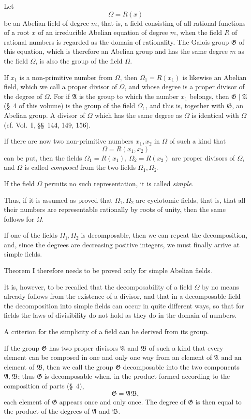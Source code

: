\documentclass[11pt]{article}
\newcommand{\Om}{\Omega}
\newcommand{\Gg}{\mathfrak G}
\newcommand{\Aa}{\mathfrak A}
\newcommand{\Bb}{\mathfrak B}
\begin{document}
Let
\[
  \Om=R(x)
\]
be an Abelian field of degree $m$, that is, a field consisting of all rational functions of a root $x$ of an irreducible Abelian equation of degree $m$, when the field $R$ of rational numbers is regarded as the domain of rationality. The Galois group $\Gg$ of this equation, which is therefore an Abelian group and has the same degree $m$ as the field $\Om$, is also the group of the field $\Om$.

If $x_1$ is a non-primitive number from $\Om$, then $\Om_1=R(x_1)$ is likewise an Abelian field, which we call a proper divisor of $\Om$, and whose degree is a proper divisor of the degree of $\Om$. For if $\Aa$ is the group to which the number $x_1$ belongs, then $\Gg\mid\Aa$ (\S~4 of this volume) is the group of the field $\Om_1$, and this is, together with $\Gg$, an Abelian group. A divisor of $\Om$ which has the same degree as $\Om$ is identical with $\Om$ (cf. Vol.~I, \S\S~144, 149, 156).

If there are now two non-primitive numbers $x_1,x_2$ in $\Om$ of such a kind that
\[
  \Om=R(x_1,x_2)
\]
can be put, then the fields $\Om_1=R(x_1)$, $\Om_2=R(x_2)$ are proper divisors of $\Om$, and $\Om$ is called \emph{composed} from the two fields $\Om_1,\Om_2$.

If the field $\Om$ permits no such representation, it is called \emph{simple}.

Thus, if it is assumed as proved that $\Om_1,\Om_2$ are cyclotomic fields, that is, that all their numbers are representable rationally by roots of unity, then the same follows for $\Om$.

If one of the fields $\Om_1,\Om_2$ is decomposable, then we can repeat the decomposition, and, since the degrees are decreasing positive integers, we must finally arrive at simple fields.

Theorem I therefore needs to be proved only for simple Abelian fields.

It is, however, to be recalled that the decomposability of a field $\Om$ by no means already follows from the existence of a divisor, and that in a decomposable field the decomposition into simple fields can occur in quite different ways, so that for fields the laws of divisibility do not hold as they do in the domain of numbers.

A criterion for the simplicity of a field can be derived from its group.

If the group $\Gg$ has two proper divisors $\Aa$ and $\Bb$ of such a kind that every element can be composed in one and only one way from an element of $\Aa$ and an element of $\Bb$, then we call the group $\Gg$ decomposable into the two components $\Aa,\Bb$; thus $\Gg$ is decomposable when, in the product formed according to the composition of parts (\S~4),
\begin{equation}
  \Gg=\Aa\Bb,
\tag{1}
\end{equation}
each element of $\Gg$ appears once and only once. The degree of $\Gg$ is then equal to the product of the degrees of $\Aa$ and $\Bb$.
\end{document}
